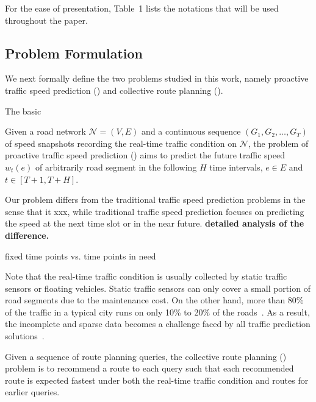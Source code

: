 For the ease of presentation, Table~1 lists the notations that will be used throughout the paper.

\subsection{Problem Formulation}
\label{subsec-problem}

We next formally define the two problems studied in this work, namely proactive traffic speed prediction (\ptsp) and collective route planning (\crp).

The basic

\begin{definition}Given a road network $\mathcal{N}=(V,E)$ and a continuous sequence $(G_1, G_2, \dots, G_T)$ of speed snapshots recording the real-time traffic condition on $\mathcal{N}$, the problem of proactive traffic speed prediction (\ptsp) aims to predict the future traffic speed $w_t(e)$ of arbitrarily road segment in the following $H$ time intervals, \ie $e\in E$ and $t\in[T+1,T+H]$.
\end{definition}

Our \ptsp problem differs from the traditional traffic speed prediction problems in the sense that it
xxx, while traditional traffic speed prediction focuses on predicting the speed at the next time slot or in the near future. {\bf detailed analysis of the difference.}

fixed time points vs. time points in need

Note that the real-time traffic condition is usually collected by static traffic sensors or floating vehicles. Static traffic sensors can only cover a small portion of road segments due to the maintenance cost. On the other hand, more than 80\% of the traffic in a typical city runs on only 10\% to 20\% of the roads~\cite{WuMSZZCWKDD16}. As a result, the incomplete and sparse data becomes a challenge faced by all traffic prediction solutions~\cite{Zhu2013TMC,Shang2014KDD,Lu2017Speed}.


\begin{definition} Given a sequence of route planning queries, the collective route planning (\crp) problem is to recommend a route to each query such that each recommended route is expected fastest under both the real-time traffic condition and routes for earlier queries.
\end{definition}
